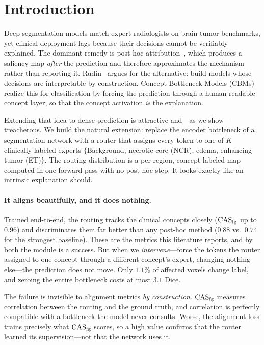 \section{Introduction}
\label{sec:intro}

Deep segmentation models match expert radiologists on brain-tumor benchmarks, yet clinical
deployment lags because their decisions cannot be verifiably explained. The dominant remedy is
post-hoc attribution~\cite{selvaraju2017gradcam,sundararajan2017ig,lundberg2017shap}, which
produces a saliency map \emph{after} the prediction and therefore approximates the mechanism
rather than reporting it. Rudin~\cite{rudin2019stop} argues for the alternative: build models
whose decisions are interpretable by construction. Concept Bottleneck Models
(CBMs)~\cite{koh2020cbm} realize this for classification by forcing the prediction through a
human-readable concept layer, so that the concept activation \emph{is} the explanation.

Extending that idea to dense prediction is attractive and---as we show---treacherous. We build the
natural extension: replace the encoder bottleneck of a segmentation network with a router that
assigns every token to one of $K$ clinically labeled experts $\{$Background, necrotic core (NCR),
edema, enhancing tumor (ET)$\}$. The routing distribution is a per-region, concept-labeled map computed in one
forward pass with no post-hoc step. It looks exactly like an intrinsic explanation should.

\paragraph{It aligns beautifully, and it does nothing.}
Trained end-to-end, the routing tracks the clinical concepts closely ($\mathrm{CAS}_{\mathrm{fg}}$ up to $0.96$) and
discriminates them far better than any post-hoc method ($0.88$ vs.\ $0.74$ for the strongest
baseline). These are the metrics this literature reports, and by both the module is a success.
But when we \emph{intervene}---force the tokens the router assigned to one concept through a
different concept's expert, changing nothing else---the prediction does not move. Only $1.1\%$ of
affected voxels change label, and zeroing the entire bottleneck costs at most $3.1$ Dice.

The failure is invisible to alignment metrics \emph{by construction}. $\mathrm{CAS}_{\mathrm{fg}}$ measures
correlation between the routing and the ground truth, and correlation is perfectly compatible
with a bottleneck the model never consults. Worse, the alignment loss trains precisely what
$\mathrm{CAS}_{\mathrm{fg}}$ scores, so a high value confirms that the router learned its supervision---not that the
network uses it.

